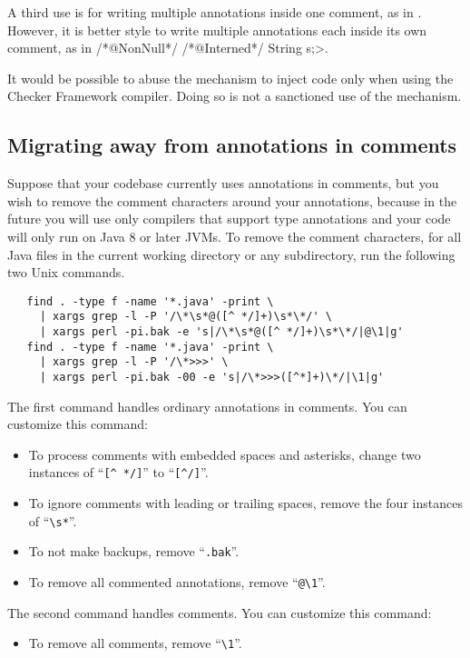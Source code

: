 A third use is for writing multiple annotations inside one
comment, as in .
However, it is better style to write multiple annotations each
inside its own comment, as in \</*@NonNull*/ /*@Interned*/ String s;>.

It would be possible to abuse the  mechanism to inject
code only when using
the Checker Framework compiler.  Doing so is not a sanctioned use of the
mechanism.


\subsection{Migrating away from annotations in comments\label{uncommenting-annotations}}

Suppose that your codebase currently uses annotations in comments, but you
wish to remove the comment characters around your annotations, because in
the future you will use only compilers that support type annotations and
your code will only run on Java 8 or later JVMs.
To remove
the comment characters, for all Java files in the current
working directory or any subdirectory, run the following two Unix commands.

\begin{Verbatim}
   find . -type f -name '*.java' -print \
     | xargs grep -l -P '/\*\s*@([^ */]+)\s*\*/' \
     | xargs perl -pi.bak -e 's|/\*\s*@([^ */]+)\s*\*/|@\1|g'
   find . -type f -name '*.java' -print \
     | xargs grep -l -P '/\*>>>' \
     | xargs perl -pi.bak -00 -e 's|/\*>>>([^*]+)\*/|\1|g'
\end{Verbatim}

The first command handles ordinary annotations in comments.
You can customize this command:
\begin{itemize}
\item
To process comments with embedded spaces and asterisks, change
two instances of ``\verb|[^ */]|'' to ``\verb|[^/]|''.
\item
To ignore comments with leading or trailing spaces, remove the four
instances of ``\verb|\s*|''.
\item
  To not make backups, remove ``\verb|.bak|''.
\item
  To remove all commented annotations, remove ``\verb|@\1|''.
\end{itemize}

The second command handles \code{/*>>>} comments.
You can customize this command:
\begin{itemize}
\item
  To remove all \code{/*>>>} comments, remove ``\verb|\1|''.
\end{itemize}

